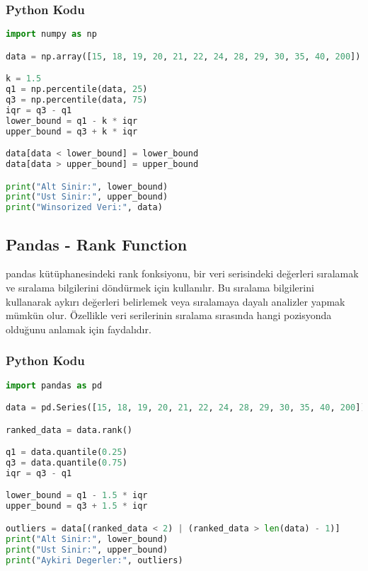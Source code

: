 \subsubsection{Python Kodu}

\begin{lstlisting}[language=Python]
import numpy as np

data = np.array([15, 18, 19, 20, 21, 22, 24, 28, 29, 30, 35, 40, 200])

k = 1.5
q1 = np.percentile(data, 25)
q3 = np.percentile(data, 75)
iqr = q3 - q1
lower_bound = q1 - k * iqr
upper_bound = q3 + k * iqr

data[data < lower_bound] = lower_bound
data[data > upper_bound] = upper_bound

print("Alt Sinir:", lower_bound)
print("Ust Sinir:", upper_bound)
print("Winsorized Veri:", data)
\end{lstlisting}

\newpage

\subsection{Pandas - Rank Function}
pandas kütüphanesindeki rank fonksiyonu, bir veri serisindeki değerleri sıralamak ve sıralama bilgilerini döndürmek için kullanılır. Bu sıralama bilgilerini kullanarak aykırı değerleri belirlemek veya sıralamaya dayalı analizler yapmak mümkün olur. Özellikle veri serilerinin sıralama sırasında hangi pozisyonda olduğunu anlamak için faydalıdır.

\subsubsection{Python Kodu}

\begin{lstlisting}[language=Python]
import pandas as pd

data = pd.Series([15, 18, 19, 20, 21, 22, 24, 28, 29, 30, 35, 40, 200])

ranked_data = data.rank()

q1 = data.quantile(0.25)
q3 = data.quantile(0.75)
iqr = q3 - q1

lower_bound = q1 - 1.5 * iqr
upper_bound = q3 + 1.5 * iqr

outliers = data[(ranked_data < 2) | (ranked_data > len(data) - 1)]
print("Alt Sinir:", lower_bound)
print("Ust Sinir:", upper_bound)
print("Aykiri Degerler:", outliers)
\end{lstlisting}

